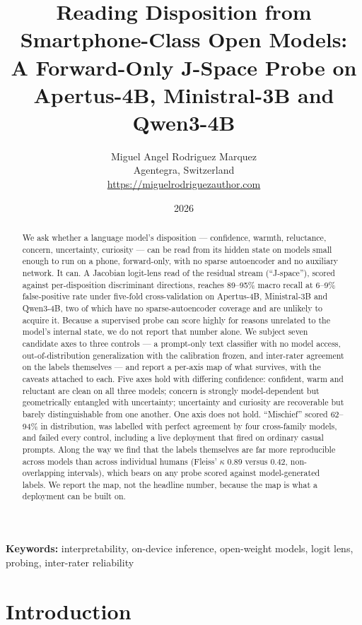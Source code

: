 \documentclass[11pt]{article}
\title{Reading Disposition from Smartphone-Class Open Models:\\
       A Forward-Only J-Space Probe on Apertus-4B, Ministral-3B and Qwen3-4B}
\author{Miguel Angel Rodriguez Marquez\\
        Agentegra, Switzerland\\
        \url{https://miguelrodriguezauthor.com}}
\date{2026}
\begin{document}
\maketitle

\begin{abstract}
We ask whether a language model's disposition --- confidence, warmth, reluctance, concern,
uncertainty, curiosity --- can be read from its hidden state on models small enough to run on a
phone, forward-only, with no sparse autoencoder and no auxiliary network. It can. A Jacobian
logit-lens read of the residual stream (``J-space''), scored against per-disposition discriminant
directions, reaches 89--95\% macro recall at 6--9\% false-positive rate under five-fold
cross-validation on Apertus-4B, Ministral-3B and Qwen3-4B, two of which have no sparse-autoencoder
coverage and are unlikely to acquire it. Because a supervised probe can score highly for reasons
unrelated to the model's internal state, we do not report that number alone. We subject seven
candidate axes to three controls --- a prompt-only text classifier with no model access,
out-of-distribution generalization with the calibration frozen, and inter-rater agreement on the
labels themselves --- and report a per-axis map of what survives, with the caveats attached to
each. Five axes hold with differing confidence: confident, warm and reluctant are clean on all
three models; concern is strongly model-dependent but geometrically entangled with uncertainty;
uncertainty and curiosity are recoverable but barely distinguishable from one another. One axis
does not hold. ``Mischief'' scored 62--94\% in distribution, was labelled with perfect agreement
by four cross-family models, and failed every control, including a live deployment that fired on
ordinary casual prompts. Along the way we find that the labels themselves are far more reproducible
across models than across individual humans (Fleiss' $\kappa$ 0.89 versus 0.42, non-overlapping
intervals), which bears on any probe scored against model-generated labels. We report the map, not the headline number, because the map is what a
deployment can be built on.
\end{abstract}

\noindent\textbf{Keywords:} interpretability, on-device inference, open-weight models, logit lens,
probing, inter-rater reliability

\section{Introduction}
\end{document}
